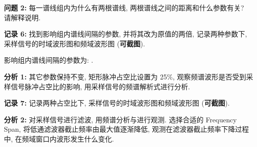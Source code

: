 \documentclass{dspreport}
\begin{document}
\begin{block}

\end{block}

\textbf{问题 2:} 每一谱线组内为什么有两根谱线, 两根谱线之间的距离和什么参数有关? 请解释说明.

\begin{block}

\end{block}

\textbf{记录 6:} 找到影响组内谱线间隔的参数, 并将其改为原值的两倍, 记录两种参数下, 采样信号的时域波形图和频域波形图 (\textbf{可截图}).

影响组内谱线间隔的参数为: \underline{\blank{  }}.

\begin{block}

\end{block}

\begin{figure}[H]
    \centering
\end{figure}

\begin{block}

\end{block}

\textbf{分析 1:} 其它参数保持不变, 矩形脉冲占空比设置为 25\%, 观察频谱波形是否受到采样信号脉冲占空比的影响, 用采样信号的频谱解析式进行分析.

\begin{block}

\end{block}

\textbf{记录 7:} 记录两种占空比下, {\color{red} 采样信号}的时域波形图和频域波形图 (\textbf{可截图}).

\begin{block}

\end{block}

\begin{figure}[H]
    \centering
\end{figure}

\begin{block}

\end{block}

\textbf{分析 2:} 对采样信号进行滤波, 用频谱分析与进行观测. 选择合适的 Frequency Span, 将低通滤波器截止频率由最大值逐渐降低, 观测在滤波器截止频率下降过程中, 在频域窗口内波形发生什么变化.
\end{document}
